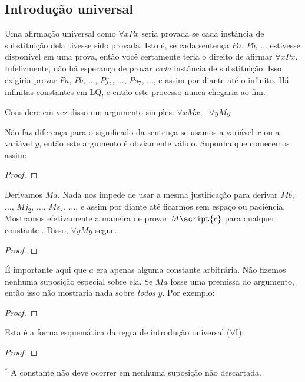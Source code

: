 \subsection{Introdução universal}
Uma afirmação universal como $\forall x Px$ seria provada se {cada} instância de substituição dela tivesse sido provada. Isto é, se cada sentença $Pa$, $Pb$, $\ldots$ estivesse disponível em uma prova, então você certamente teria o direito de afirmar $\forall x Px$. Infelizmente, não há esperança de provar \emph{cada} instância de substituição. Isso exigiria provar $Pa$, $Pb$, $\ldots$, $Pj_2$, $\ldots$, $Ps_7$, $\ldots$, e assim por diante até o infinito. Há infinitas constantes em LQ, e então este processo nunca chegaria ao fim.

Considere em vez disso um argumento simples: $\forall x Mx$, \therefore\ $\forall y My$

Não faz diferença para o significado da sentença se usamos a variável $x$ ou a variável $y$, então este argumento é obviamente válido. Suponha que comecemos assim:

\begin{proof}
	 
	 
\end{proof}

Derivamos $Ma$. Nada nos impede de usar a mesma justificação para derivar $Mb$, $\ldots$, $Mj_2$, $\ldots$, $Ms_7$, $\ldots$, e assim por diante até ficarmos sem espaço ou paciência. Mostramos efetivamente a maneira de provar $M\script{c}$ para qualquer constante . Disso, $\forall y My$ segue.

\begin{proof}
	 
	 
\end{proof}

É importante aqui que $a$ era apenas alguma constante arbitrária. Não fizemos nenhuma suposição especial sobre ela. Se $Ma$ fosse uma premissa do argumento, então isso não mostraria nada sobre \emph{todos} $y$. Por exemplo:

\begin{proof}
	 
	 
\end{proof}


Esta é a forma esquemática da regra de introdução universal ($\forall$I):

\begin{proof}
	 
\end{proof}
$^\ast$ A constante  não deve ocorrer em nenhuma suposição não descartada.

